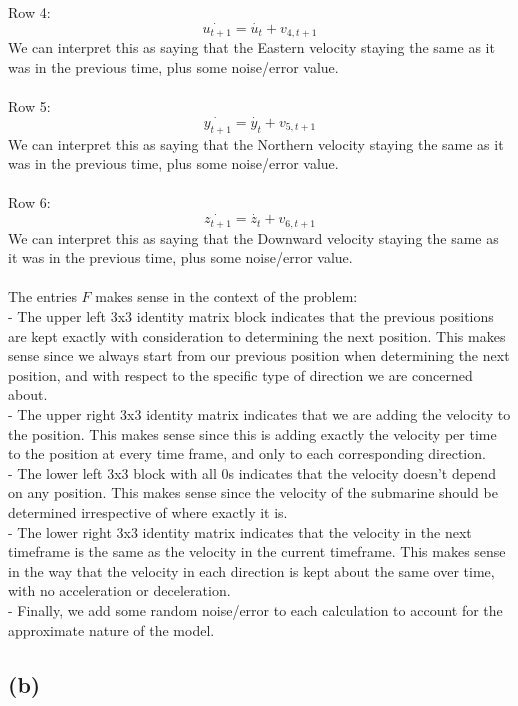 \documentclass{article}
\begin{document}
{Row 4:
\[
  \dot{u_{t+1}} = \dot{u_t} + v_{4,t+1}
\]
We can interpret this as saying that the Eastern velocity staying the same as it was in the previous time, plus some noise/error value. \\ \\
Row 5:
\[
  \dot{y_{t+1}} = \dot{y_t} + v_{5,t+1}
\]
We can interpret this as saying that the Northern velocity staying the same as it was in the previous time, plus some noise/error value. \\ \\
Row 6:
\[
  \dot{z_{t+1}} = \dot{z_t} + v_{6,t+1}
\]
We can interpret this as saying that the Downward velocity staying the same as it was in the previous time, plus some noise/error value. \\ \\
The entries \(F\) makes sense in the context of the problem: \\
- The upper left 3x3 identity matrix block indicates that the previous positions are kept exactly with consideration to determining the next position. This makes sense since we always start from our previous position when determining the next position, and with respect to the specific type of direction we are concerned about. \\
- The upper right 3x3 identity matrix indicates that we are adding the velocity to the position. This makes sense since this is adding exactly the velocity per time to the position at every time frame, and only to each corresponding direction. \\
- The lower left 3x3 block with all 0s indicates that the velocity doesn't depend on any position. This makes sense since the velocity of the submarine should be determined irrespective of where exactly it is. \\ 
- The lower right 3x3 identity matrix indicates that the velocity in the next timeframe is the same as the velocity in the current timeframe. This makes sense in the way that the velocity in each direction is kept about the same over time, with no acceleration or deceleration. \\ 
- Finally, we add some random noise/error to each calculation to account for the approximate nature of the model.

\subsection*{(b)}

}
\end{document}
